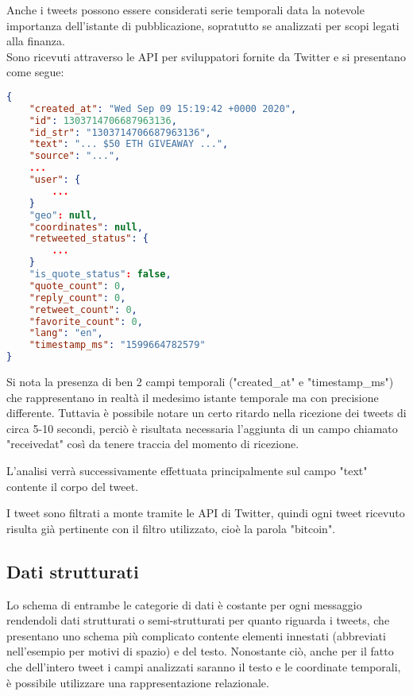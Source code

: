 Anche i tweets possono essere considerati serie temporali data la notevole importanza
dell'istante di pubblicazione, sopratutto se analizzati per scopi legati alla finanza.
\\
Sono ricevuti attraverso le API per sviluppatori fornite da Twitter \cite{twitter} e si
presentano come segue:

\begin{lstlisting}[language=json,firstnumber=1]
{
    "created_at": "Wed Sep 09 15:19:42 +0000 2020",
    "id": 1303714706687963136,
    "id_str": "1303714706687963136",
    "text": "... $50 ETH GIVEAWAY ...",
    "source": "...",
    ...
    "user": {
        ...
    }
    "geo": null,
    "coordinates": null,
    "retweeted_status": {
        ...
    }
    "is_quote_status": false,
    "quote_count": 0,
    "reply_count": 0,
    "retweet_count": 0,
    "favorite_count": 0,
    "lang": "en",
    "timestamp_ms": "1599664782579"
}
\end{lstlisting}
%
Si nota la presenza di ben 2 campi temporali ("created\_at" e "timestamp\_ms") che
rappresentano in realtà il medesimo istante temporale ma con precisione differente.
Tuttavia è possibile notare un certo ritardo nella ricezione dei tweets di circa 5-10
secondi, perciò è risultata necessaria l'aggiunta di un campo chiamato "receivedat" così
da tenere traccia del momento di ricezione.

L'analisi verrà successivamente effettuata principalmente sul campo "text" contente il
corpo del tweet.

I tweet sono filtrati a monte tramite le API di Twitter, quindi ogni tweet ricevuto risulta già
pertinente con il filtro utilizzato, cioè la parola "bitcoin".

\subsection{Dati strutturati}

Lo schema di entrambe le categorie di dati è costante per ogni messaggio rendendoli dati
strutturati o semi-strutturati per quanto riguarda i tweets, che presentano uno schema più complicato
contente elementi innestati (abbreviati nell'esempio per motivi di spazio) e del testo.
Nonostante ciò, anche per il fatto che dell'intero tweet i campi analizzati saranno il testo
e le coordinate temporali, è possibile utilizzare una rappresentazione relazionale.
